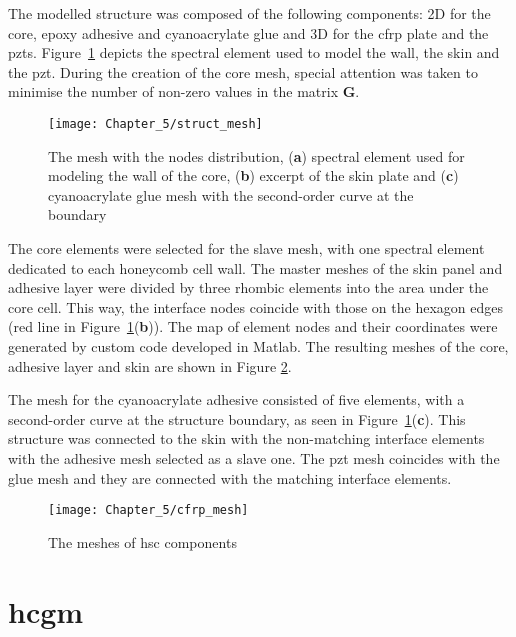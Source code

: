 \documentclass[11pt,a4paper,final]{report}
\theoremstyle{plain}
\begin{document}
The modelled structure was composed of the following components: 2D for the core, epoxy adhesive and cyanoacrylate glue and 3D for the \ac{cfrp} plate and the \acp{pzt}.
Figure~\ref{fig:struct_mesh} depicts the spectral element used to model the wall, the skin and the \ac{pzt}.
During the creation of the core mesh, special attention was taken to minimise the number of non-zero values in the matrix \(\textbf{G}\).
\begin{figure}[H]
	\begin{center}
		\texttt{[image: Chapter\_5/struct\_mesh]}
	\end{center}
	\caption{The mesh with the nodes distribution, (\textbf{a}) spectral element used for modeling the wall of the core, (\textbf{b}) excerpt of the skin plate and (\textbf{c}) cyanoacrylate glue mesh with the second-order curve at the boundary}
	\label{fig:struct_mesh}
\end{figure}

The core elements were selected for the slave mesh, with one spectral element dedicated to each honeycomb cell wall.
The master meshes of the skin panel and adhesive layer were divided by three rhombic elements into the area under the core cell.
This way, the interface nodes coincide with those on the hexagon edges (red line in Figure~\ref{fig:struct_mesh}(\textbf{b})).
The map of element nodes and their coordinates were generated by custom code developed in Matlab.
The resulting meshes of the core, adhesive layer and skin are shown in Figure \ref{fig:cas_mesh}.

The mesh for the cyanoacrylate adhesive consisted of five elements, with a second-order curve at the structure boundary, as seen in Figure~\ref{fig:struct_mesh}(\textbf{c}).
This structure was connected to the skin with the non-matching interface elements with the adhesive mesh selected as a slave one.
The \ac{pzt} mesh coincides with the glue mesh and they are connected with the matching interface elements.

\begin{figure}[H]
	\begin{center}
		\texttt{[image: Chapter\_5/cfrp\_mesh]}
	\end{center}
	\caption{The meshes of \acl{hsc} components}
	\label{fig:cas_mesh}
\end{figure}
 \section{\Acl{hcgm}}
\label{sec:homogenised}
\end{document}
